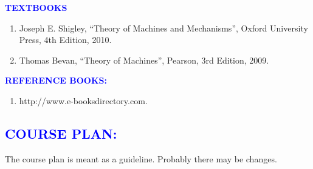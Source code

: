\documentclass[11pt]{exam}
\begin{document}
\raggedright	\textcolor{blue}{\textbf{TEXTBOOKS}}\\
\begin{enumerate}
		\item  Joseph E. Shigley, “Theory of Machines and Mechanisms”, Oxford University Press, 4th Edition, 2010.
		\item Thomas Bevan, “Theory of Machines”, Pearson, 3rd Edition, 2009.
	\end{enumerate}
  \textcolor{blue}{\textbf{REFERENCE BOOKS:}}\\
\begin{enumerate}
	\vspace{-0.5cm}
	\item http://www.e-booksdirectory.com.

\end{enumerate}
\vspace{-1cm}
\textcolor{blue}{\section{\large \bfseries	COURSE PLAN:}}\vspace{-0.4cm}
The course plan is meant as a guideline. Probably there may be changes.
\end{document}
